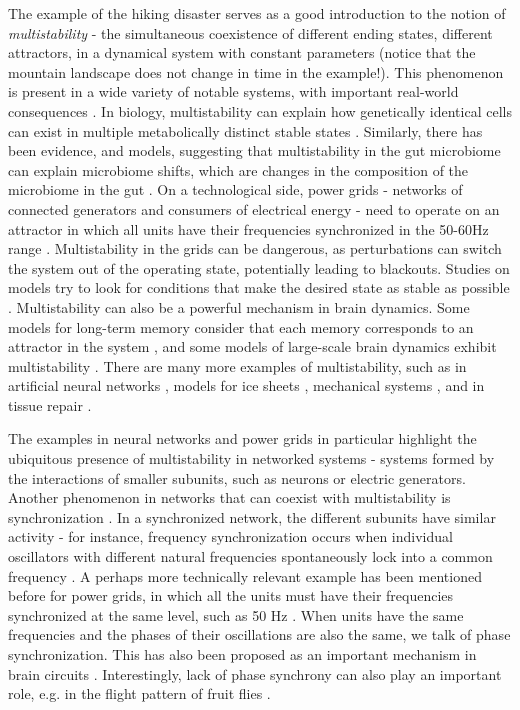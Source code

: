The example of the hiking disaster serves as a good introduction to the notion of \textit{multistability} - the simultaneous coexistence of different ending states, different attractors, in a dynamical system with constant parameters (notice that the mountain landscape does not change in time in the example!). This phenomenon is present in a wide variety of notable systems, with important real-world consequences \cite{feudel2008complex, pisarchik2022multistability, pisarchik2014control}. In biology, multistability can explain how genetically identical cells can exist in multiple metabolically distinct stable states \cite{zhu2022synthetic, regan2012dynamical}. Similarly, there has been evidence, and models, suggesting that multistability in the gut microbiome can explain microbiome shifts, which are changes in the composition of the microbiome in the gut \cite{khazaei2022metabolic}. On a technological side, power grids - networks of connected generators and consumers of electrical energy - need to operate on an attractor in which all units have their frequencies synchronized in the 50-60Hz range \cite{hellmann2020network}. Multistability in the grids can be dangerous, as perturbations can switch the system out of the operating state, potentially leading to blackouts. Studies on models try to look for conditions that make the desired state as stable as possible \cite{hellmann2020network, halekotte2021transient}. Multistability can also be a powerful mechanism in brain dynamics. Some models for long-term memory consider that each memory corresponds to an attractor in the system \cite{wilson1972excitatory, foss1996multistability}, and some models of large-scale brain dynamics exhibit multistability \cite{golos2015multistability}. There are many more examples of multistability, such as in artificial neural networks \cite{flynn2024exploring}, models for ice sheets \cite{robinson2012multistability}, mechanical systems \cite{feudel1998dynamical}, and in tissue repair \cite{adler2020principles}.

The examples in neural networks and power grids in particular highlight the ubiquitous presence of multistability in networked systems - systems formed by the interactions of smaller subunits, such as neurons or electric generators.  Another phenomenon in networks that can coexist with multistability is synchronization \cite{pikovsky2001synchronization, boccaletti2018synchronization}. In a synchronized network, the different subunits have similar activity - for instance, frequency synchronization occurs when individual oscillators with different natural frequencies spontaneously lock into a common frequency \cite{strogatz2000from}. A perhaps more technically relevant example has been mentioned before for power grids, in which all the units must have their frequencies synchronized at the same level, such as 50 Hz \cite{hellmann2020network}. When units have the same frequencies and the phases of their oscillations are also the same, we talk of phase synchronization. This has also been proposed as an important mechanism in brain circuits \cite{singer1999neuronal, fries2015rhythms, womelsdorf2007the}. Interestingly, lack of phase synchrony can also play an important role, e.g. in the flight pattern of fruit flies \cite{hurkey2023gap}. 


